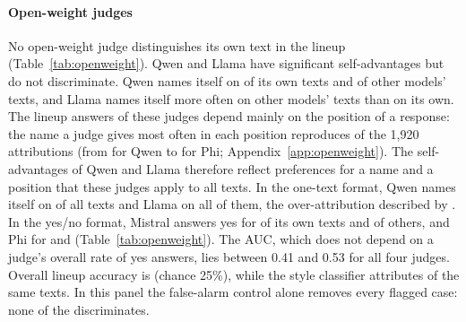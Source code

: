 \paragraph{Open-weight judges}
No open-weight judge distinguishes its own text in the lineup
(Table~\ref{tab:openweight}). Qwen and Llama have significant self-advantages
but do not discriminate. Qwen names itself on \OWQwenLineupSelf{} of its own
texts and \OWQwenLineupFA{} of other models' texts, and Llama names itself more
often on other models' texts than on its own. The lineup answers of these
judges depend mainly on the position of a response: the name a judge gives
most often in each position reproduces \CXSlotShare{} of the 1,920
attributions (from \CXSlotShareMin{} for Qwen to \CXSlotShareMax{} for Phi;
Appendix~\ref{app:openweight}). The self-advantages of Qwen and Llama
therefore reflect preferences for a name and a position that these judges
apply to all texts. In the one-text format, Qwen names itself on
\OWQwenSingleNamesSelf{} of all texts and Llama on all of them, the
over-attribution described by \citet{bai2025selfrecognition}. In the yes/no
format, Mistral answers yes for \OWMistralBinaryHit{} of its own texts and
\OWMistralBinaryFA{} of others, and Phi for \OWPhiBinaryHit{} and
\OWPhiBinaryFA{} (Table~\ref{tab:openweight}). The AUC, which does not depend
on a judge's overall rate of yes answers, lies between 0.41 and 0.53 for all
four judges. Overall lineup accuracy is \OWLineupAcc{} (chance 25\%), while the
style classifier attributes \OWClfPooled{} of the same texts. In this panel the
false-alarm control alone removes every flagged case: none of the
\CVopenFlagged{} discriminates.


